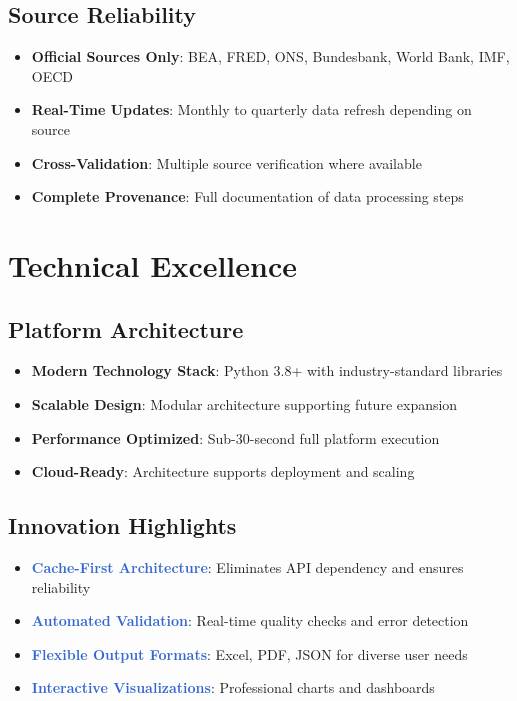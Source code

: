 \documentclass[11pt,a4paper]{article}
\begin{document}
\subsection{Source Reliability}
\begin{itemize}
    \item \textbf{Official Sources Only}: BEA, FRED, ONS, Bundesbank, World Bank, IMF, OECD
    \item \textbf{Real-Time Updates}: Monthly to quarterly data refresh depending on source
    \item \textbf{Cross-Validation}: Multiple source verification where available
    \item \textbf{Complete Provenance}: Full documentation of data processing steps
\end{itemize}

\section{Technical Excellence}

\subsection{Platform Architecture}
\begin{itemize}
    \item \textbf{Modern Technology Stack}: Python 3.8+ with industry-standard libraries
    \item \textbf{Scalable Design}: Modular architecture supporting future expansion
    \item \textbf{Performance Optimized}: Sub-30-second full platform execution
    \item \textbf{Cloud-Ready}: Architecture supports deployment and scaling
\end{itemize}

\subsection{Innovation Highlights}
\begin{itemize}
    \item \textcolor{highlight}{\textbf{Cache-First Architecture}}: Eliminates API dependency and ensures reliability
    \item \textcolor{highlight}{\textbf{Automated Validation}}: Real-time quality checks and error detection
    \item \textcolor{highlight}{\textbf{Flexible Output Formats}}: Excel, PDF, JSON for diverse user needs
    \item \textcolor{highlight}{\textbf{Interactive Visualizations}}: Professional charts and dashboards
\end{itemize}
\end{document}
